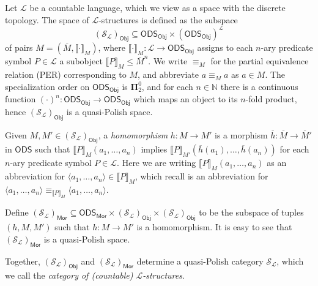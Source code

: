 \documentclass{article}
\theoremstyle{plain}
\def\cal#1{{\mathcal #1}}
\def\bpi#1{\mathbf{\Pi}^0_{#1}}
\def\IN{{\mathbb N}}
\def\calL{{\cal L}}
\def\calS{{\cal S}}
\newcommand{\ODS}{{\mathsf{ODS}}}
\newcommand{\Mor}{\mathsf{Mor}}
\newcommand{\Obj}{\mathsf{Obj}}
\begin{document}
Let $\calL$ be a countable language, which we view as a space with the discrete topology. The space of $\calL$-structures is defined as the subspace \[(\calS_\calL)_\Obj \subseteq \ODS_\Obj\times (\ODS_\Obj)^\calL\]
of pairs $M=(\overline{M},\llbracket \cdot\rrbracket_M)$, where $\llbracket \cdot\rrbracket_M\colon\calL\to\ODS_\Obj$ assigns to each $n$-ary predicate symbol $P\in\calL$ a subobject $\llbracket P\rrbracket_M\leq \overline{M}^n$.  We write $\equiv_M$ for the partial equivalence relation (PER) corresponding to $M$, and abbreviate $a \equiv_M a$ as $a\in M$. The specialization order on $\ODS_\Obj$ is $\bpi 2$, and for each $n\in\IN$ there is a continuous function $(\cdot)^n \colon\ODS_\Obj\to\ODS_\Obj$ which maps an object to its $n$-fold product, hence $(\calS_\calL)_\Obj$ is a quasi-Polish space. 

Given $M,M'\in (\calS_\calL)_\Obj$, a \emph{homomorphism} $h\colon M\to M'$ is a morphism $\overline{h}\colon \overline{M}\to\overline{M}'$ in $\ODS$ such that $\llbracket P\rrbracket_M(a_1,\ldots,a_n)$ implies $\llbracket P\rrbracket_{M'}(\overline{h}(a_1),\ldots,\overline{h}(a_n))$ for each $n$-ary predicate symbol $P\in\calL$. Here we are writing $\llbracket P\rrbracket_M(a_1,\ldots,a_n)$ as an abbreviation for $\langle a_1,\ldots,a_n \rangle \in \llbracket P\rrbracket_M$,  which recall is an abbreviation for $\langle a_1,\ldots,a_n \rangle \equiv_{\llbracket P\rrbracket_M} \langle a_1,\ldots,a_n \rangle$.


Define $(\calS_\calL)_\Mor\subseteq \ODS_\Mor\times (\calS_\calL)_\Obj\times (\calS_\calL)_\Obj$ to be the subspace of tuples $(h,M,M')$ such that $h\colon M\to M'$ is a homomorphism. It is easy to see that $(\calS_\calL)_\Mor$ is a quasi-Polish space. 

Together, $(\calS_\calL)_\Obj$ and $(\calS_\calL)_\Mor$ determine a quasi-Polish category $\calS_\calL$, which we call the \emph{category of (countable) $\calL$-structures}.
\end{document}
